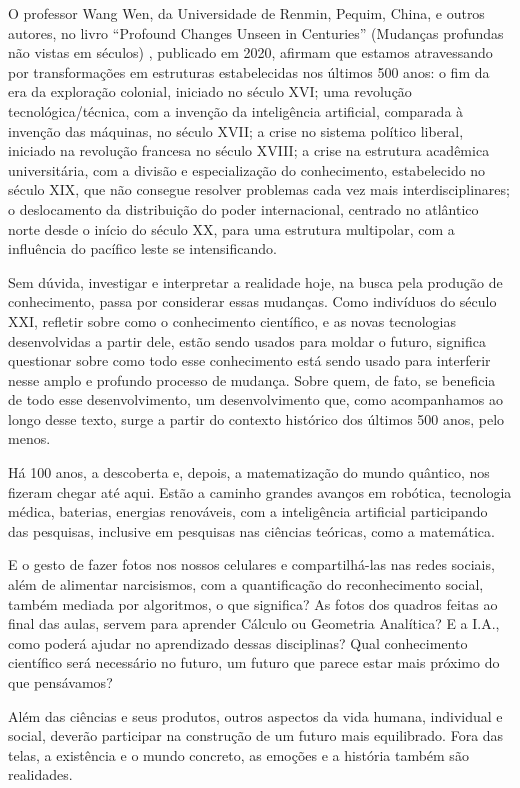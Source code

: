 \documentclass{hipatia}
\begin{document}
	O professor Wang Wen, da Universidade de Renmin, Pequim, China, e outros autores, no livro ``Profound Changes Unseen in Centuries'' (Mudanças profundas não vistas em séculos) \cite{Wang2022}, publicado em 2020, afirmam que estamos atravessando por transformações em estruturas estabelecidas nos últimos 500 anos: o fim da era da exploração colonial, iniciado no século XVI; uma revolução tecnológica/técnica, com a invenção da inteligência artificial, comparada à invenção das máquinas, no século XVII; a crise no sistema político liberal, iniciado na revolução francesa no século XVIII; a crise na estrutura acadêmica universitária, com a divisão e especialização do conhecimento, estabelecido no século XIX, que não consegue resolver problemas cada vez mais interdisciplinares; o deslocamento da distribuição do poder internacional, centrado no atlântico norte desde o início do século XX, para uma estrutura multipolar, com a influência do pacífico leste se intensificando.

	Sem dúvida, investigar e interpretar a realidade hoje, na busca pela produção de conhecimento, passa por considerar essas mudanças. Como indivíduos do século XXI, refletir sobre como o conhecimento científico, e as novas tecnologias desenvolvidas a partir dele, estão sendo usados para moldar o futuro, significa questionar sobre como todo esse conhecimento está sendo usado para interferir nesse amplo e profundo processo de mudança.  Sobre quem, de fato, se beneficia de todo esse desenvolvimento, um desenvolvimento que, como acompanhamos ao longo desse texto, surge a partir do contexto histórico dos últimos 500 anos, pelo menos. 

	Há 100 anos, a descoberta e, depois, a matematização do mundo quântico, nos fizeram chegar até aqui. Estão a caminho grandes avanços em robótica, tecnologia médica, baterias, energias renováveis, com a  inteligência artificial participando das pesquisas, inclusive em pesquisas nas ciências teóricas, como a matemática.

	E o gesto de fazer fotos nos nossos celulares e compartilhá-las nas redes sociais, além de alimentar narcisismos, com a quantificação do reconhecimento social, também mediada por algoritmos, o que significa? As fotos dos quadros feitas ao final das aulas, servem para aprender Cálculo ou Geometria Analítica? E a I.A., como poderá ajudar no aprendizado dessas disciplinas? Qual conhecimento científico será necessário no futuro, um futuro que parece estar mais próximo do que pensávamos?


	Além das ciências e seus produtos, outros aspectos da vida humana, individual e social, deverão participar na construção de um futuro mais equilibrado. Fora das telas, a existência e o mundo concreto, as emoções e a história também são realidades.
\end{document}
